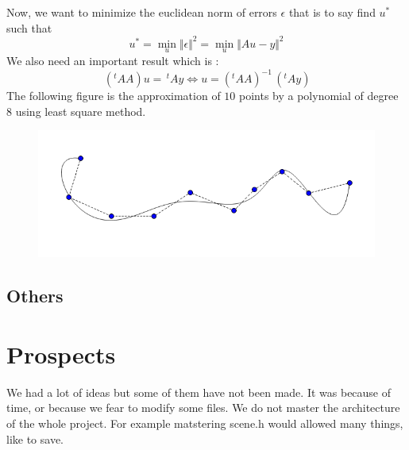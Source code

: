 \documentclass{article}
\begin{document}
 Now, we want to minimize the euclidean norm of errors $\epsilon$ that is to say find $u^*$ such that
 \[  
 	u^* = \min_{u} \Vert \epsilon \Vert^2 = \min_{u} \Vert Au - y \Vert^2
 \]
 We also need an important result which is : 
 \[ \,(^tAA)u = \,^tAy \iff u =  (^tAA)^{-1}\,(^tAy)\] 
 The following figure is the approximation of $10$ points by a polynomial of degree $8$ using
 least square method.
 \begin{figure}[H]
	\center
   \includegraphics[scale = 0.4]{Pictures/sq1.png}
\end{figure}
\subsection*{Others} %
\section*{Prospects}
We had a lot of ideas but some of them have not been made. It was because of time, or because we fear to modify some files. We do not master the architecture of the whole project. For example matstering scene.h would allowed many things, like to save. 
\end{document}
